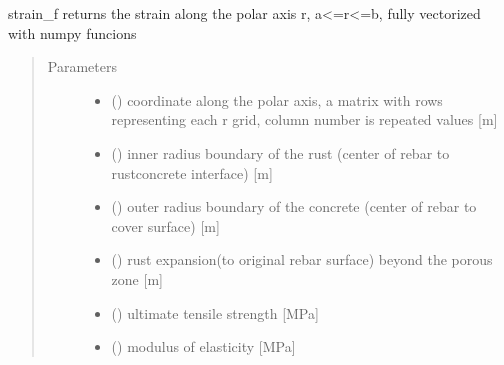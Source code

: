 \documentclass[letterpaper,10pt,english]{sphinxmanual}
\begin{document}

\begin{fulllineitems}
\label{\detokenize{cracking:cracking.strain_f}}
\sphinxAtStartPar
strain\_f returns the strain along the polar axis r, a\textless{}=r\textless{}=b,
fully vectorized with numpy funcions
\begin{quote}\begin{description}
\item[{Parameters}] \leavevmode\begin{itemize}
\item {} 
\sphinxAtStartPar
{} () \textendash{} coordinate along the polar axis, a matrix with rows representing each r grid,
column number is repeated values {[}m{]}

\item {} 
\sphinxAtStartPar
{} () \textendash{} inner radius boundary of the rust
(center of rebar to rust\sphinxhyphen{}concrete interface) {[}m{]}

\item {} 
\sphinxAtStartPar
{} () \textendash{} outer radius boundary of the concrete
(center of rebar to cover surface) {[}m{]}

\item {} 
\sphinxAtStartPar
{} () \textendash{} rust expansion(to original rebar surface) beyond the porous zone {[}m{]}

\item {} 
\sphinxAtStartPar
{} () \textendash{} ultimate tensile strength {[}MPa{]}

\item {} 
\sphinxAtStartPar
{} () \textendash{} modulus of elasticity {[}MPa{]}


\end{itemize}
\end{description}
\end{quote}
\end{fulllineitems}
\end{document}
